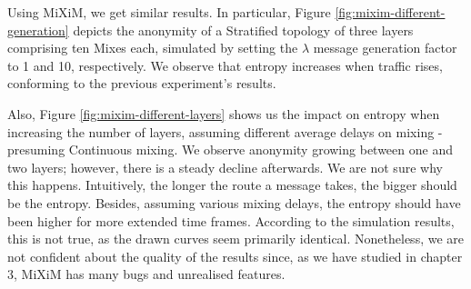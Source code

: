 \documentclass[logo,msc,cyber]{infthesis}   %
\begin{document}
 Using MiXiM, we get similar results. In particular, Figure
 \ref{fig:mixim-different-generation} depicts the anonymity of a Stratified
 topology of three layers comprising ten Mixes each, simulated by setting the
 $\lambda$ message generation factor to 1 and 10, respectively. We observe that
 entropy increases when traffic rises, conforming to the previous experiment's
 results.

 Also, Figure \ref{fig:mixim-different-layers} shows us the impact on entropy
 when increasing the number of layers, assuming different average delays on
 mixing - presuming Continuous mixing. We observe anonymity growing between one
 and two layers; however, there is a steady decline afterwards. We are not sure
 why this happens. Intuitively, the longer the route a message takes, the bigger
 should be the entropy. Besides, assuming various mixing delays, the entropy
 should have been higher for more extended time frames. According to the
 simulation results, this is not true, as the drawn curves seem primarily
 identical. Nonetheless, we are not confident about the quality of the results
 since, as we have studied in chapter 3, MiXiM has many bugs and unrealised
 features.
\end{document}
